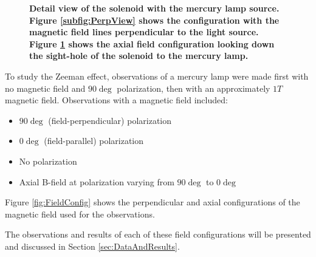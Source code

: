 \documentclass[twocolumn]{article}
\begin{document}
\begin{figure}
\begin{subfigure}{0.5\textwidth}
			\caption{}
			\label{subfig:AxialView}
		\end{subfigure}%
		\caption{\textbf{Detail view of the solenoid with the mercury lamp source. Figure \ref{subfig:PerpView} shows the configuration with the magnetic field lines perpendicular to the light source. Figure \ref{subfig:AxialView} shows the axial field configuration looking down the sight-hole of the solenoid to the mercury lamp.}}
		\label{fig:SolenoidDetail}
	\end{figure}
	
	To study the Zeeman effect, observations of a mercury lamp were made first with no magnetic field and $90\deg$ polarization, then with an approximately $1T$ magnetic field.
	Observations with a magnetic field included:
	\begin{itemize}
		\item $90\deg$ (field-perpendicular) polarization
		\item $0\deg$ (field-parallel) polarization 
		\item No polarization
		\item Axial B-field at polarization varying from $90\deg$ to $0\deg$
	\end{itemize}
	
	Figure \ref{fig:FieldConfig} shows the perpendicular and axial configurations of the magnetic field used for the observations.
	
	The observations and results of each of these field configurations will be presented and discussed in Section \ref{sec:DataAndResults}.
	
	 
	
\end{document}
